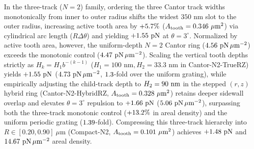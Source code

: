 \documentclass[pdflatex,sn-nature]{sn-jnl}
\DeclareRobustCommand{\roundone}[1]{\fpeval{round(#1,1)}}
\DeclareRobustCommand{\roundtwo}[1]{\fpeval{round(#1,2)}}
\DeclareRobustCommand{\roundthree}[1]{\fpeval{round(#1,3)}}
\begin{document}
In the three-track ($N=2$) family, ordering the three Cantor track widths monotonically from inner to outer radius shifts the widest $350\text{ nm}$ slot to the outer radius, increasing active tooth area by $+\roundone{\fpeval{100*(\FractalCtrlSizematchedMonotonicActiveToothAreaUmtwo-\FractalCantorFlatzActiveToothAreaUmtwo)/\FractalCantorFlatzActiveToothAreaUmtwo}}\%$ ($A_{\rm tooth} = \roundthree{\FractalCtrlSizematchedMonotonicActiveToothAreaUmtwo}\ \mu\text{m}^2$) via cylindrical arc length ($R\Delta\theta$) and yielding $+\roundtwo{\CtrlSizematchedMonotonicBemThetathreeFZPn}\text{ pN}$ at $\theta=3^\circ$. Normalized by active tooth area, however, the uniform-depth $N=2$ Cantor ring ($\roundtwo{\NatureCantorNtwoFlatzFRepPnPerToothAreaUmtwo}\text{ pN}\,\mu\text{m}^{-2}$) exceeds the monotonic control ($\roundtwo{\NatureCtrlSizematchedMonotonicFRepPnPerToothAreaUmtwo}\text{ pN}\,\mu\text{m}^{-2}$). Scaling the vertical tooth depths strictly as $H_k = H_1 b^{-(k-1)}$ ($H_1 = 100\text{ nm}, H_2 = 33.3\text{ nm}$ in Cantor-N2-TrueRZ) yields $+\roundtwo{\CantorNtwoTruerzBemThetathreeFZPn}\text{ pN}$ ($\roundtwo{\NatureCantorNtwoTruerzFRepPnPerToothAreaUmtwo}\text{ pN}\,\mu\text{m}^{-2}$, $\roundtwo{\fpeval{\CantorNtwoTruerzBemThetathreeFZPn/\CtrlUniformperiodicBemThetathreeFZPn}}$-fold over the uniform grating), while empirically adjusting the child-track depth to $H_2 = 90{}\text{ nm}$ in the stepped $(r,z)$ hybrid ring (Cantor-N2-HybridRZ, $A_{\rm tooth} = \roundthree{\FractalCantorRzScalematchedActiveToothAreaUmtwo}\ \mu\text{m}^2$) retains deeper sidewall overlap and elevates $\theta=3^\circ$ repulsion to $+\roundtwo{\CantorNtwoHybridrzBemStdFZPn}\text{ pN}$ ($\roundtwo{\NatureCantorNtwoHybridrzFRepPnPerToothAreaUmtwo}\text{ pN}\,\mu\text{m}^{-2}$), surpassing both the three-track monotonic control ($+\roundone{\fpeval{100*(\NatureCantorNtwoHybridrzFRepPnPerToothAreaUmtwo-\NatureCtrlSizematchedMonotonicFRepPnPerToothAreaUmtwo)/\NatureCtrlSizematchedMonotonicFRepPnPerToothAreaUmtwo}}\%$ in areal density) and the uniform periodic grating ($1.39{}$-fold). Compressing this three-track hierarchy into $R \in [0.20, 0.90]\ \mu\text{m}$ (Compact-N2, $A_{\rm tooth} = \roundthree{\RotCeightCompactNtwoStandardThetaZerofoureightpzeroPolarOverlapUmtwo}\ \mu\text{m}^2$) achieves $+\roundtwo{\NatureRotCeightCompactNtwoFRepPn}\text{ pN}$ and $\roundtwo{\NatureRotCeightCompactNtwoFRepPnPerToothAreaUmtwo}\text{ pN}\,\mu\text{m}^{-2}$ areal density.
\end{document}
